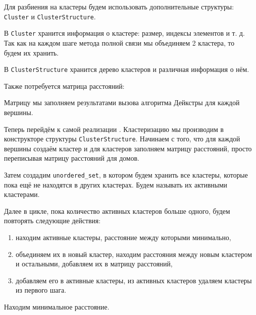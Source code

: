 \documentclass[11pt]{article}
\begin{document}
	Для разбиения на кластеры будем использовать дополнительные структуры: \texttt{Cluster} и \texttt{ClusterStructure}.
	
	В \texttt{Cluster} хранится информация о кластере: размер, индексы элементов и т. д. 
	Так как на каждом шаге метода полной связи мы объединяем 2 кластера, то будем их хранить.

	В \texttt{ClusterStructure} хранится дерево кластеров и различная информация о нём.

	

	

	Также потребуется матрица расстояний:
	

	Матрицу мы заполняем результатами вызова алгоритма Дейкстры для каждой вершины.

	Теперь перейдём к самой реализации \cite{wiki}.
	Кластеризацию мы производим в конструкторе структуры \texttt{ClusterStructure}. 
	Начинаем с того, что для каждой вершины создаём кластер и для кластеров заполняем матрицу расстояний, просто переписывая матрицу расстояний для домов.

	

	Затем создадим \texttt{unordered\_set}, в котором будем хранить все кластеры, которые пока ещё не находятся в других кластерах. 
	Будем называть их активными кластерами.

	

	Далее в цикле, пока количество активных кластеров больше одного, будем повторять следующие действия:
	\begin{enumerate}
		\item находим активные кластеры, расстояние между которыми минимально,
		\item объединяем их в новый кластер, находим расстояния между новым кластером и остальными, добавляем их в матрицу расстояний,
		\item добавляем его в активные кластеры, из активных кластеров удаляем кластеры из первого шага.
	\end{enumerate}

	Находим минимальное расстояние.
	
	
	
\end{document}
